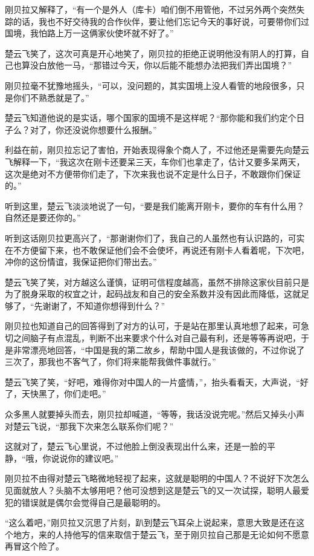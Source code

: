 刚贝拉又解释了，“有一个是外人（库卡）咱们倒不用管他，不过另外两个突然失踪的话，我也不好交待我的合作伙伴，要让他们忘记今天的事好说，可要带你们过国境，我怕路上万一这俩家伙使坏就不好了。”

楚云飞笑了，这次可真是开心地笑了，刚贝拉的拒绝正说明他没有阴人的打算，自己也算没白放他一马，“那错过今天，你以后能不能想办法把我们弄出国境？”

刚贝拉毫不犹豫地摇头，“可以，没问题的，其实国境上没人看管的地段很多，只是你们不熟悉就是了。”

楚云飞知道他说的是实话，哪个国家的国境不是这样呢？“那你能和我们约定个日子么？对了，你还没说你想要什么报酬。”

利益在前，刚贝拉忘记了害怕，开始表现得象个商人了，不过他还是需要先向楚云飞解释一下，“我这次在刚卡还要呆三天，车你们也拿走了，估计又要多呆两天，这次是绝对不方便带你们走了，下次来我也说不定是什么日子，不敢跟你们保证的。”

听到这里，楚云飞淡淡地说了一句，“要是我们能离开刚卡，要你的车有什么用？自然还是要还你的。”

听到这话刚贝拉更高兴了，“那谢谢你们了，我自己的人虽然也有认识路的，可实在不方便留下来，也不敢保证他们会不会使坏，再说还有刚卡人看着呢，下次吧，冲你的这份情谊，我保证把你们带出去。”

楚云飞笑了笑，对方越这么谨慎，证明可信程度越高，虽然不排除这家伙目前只是为了脱身采取的权宜之计，起码战友和自己的安全系数并没有因此而降低，这就足够了，“先谢谢了，不知道你想得到什么？”

刚贝拉也知道自己的回答得到了对方的认可，于是站在那里认真地想了起来，可急切之间脑子有点混乱，判断不出来要求个什么对自己最有利，还是等等再说吧，于是非常漂亮地回答，“中国是我的第二故乡，帮助中国人是我该做的，不过你说了三次了，那我也不客气了，你们将来能帮我做件事就行。”

楚云飞笑了笑，“好吧，难得你对中国人的一片盛情，”，抬头看看天，大声说，“好了，天快黑了，你们走吧。”

众多黑人就要掉头而去，刚贝拉却喊道，“等等，我话没说完呢。”然后又掉头小声对楚云飞说，“那我下次来怎么联系你们呢？”

这就对了，楚云飞心里说，不过他脸上倒没表现出什么来，还是一脸的平静，“哦，你说说你的建议吧。”

刚贝拉不由得对楚云飞略微地轻视了起来，这就是聪明的中国人？不说好下次怎么见面就放人？头脑不太够用吧？他可没想到这是楚云飞的又一次试探，聪明人最爱犯的错误就是偶尔会觉得自己是最聪明的。

“这么着吧，”刚贝拉又沉思了片刻，趴到楚云飞耳朵上说起来，意思大致是还在这个地方，来的人持他写的信来取信于楚云飞，至于刚贝拉自己那是无论如何不愿意再冒这个险了。

